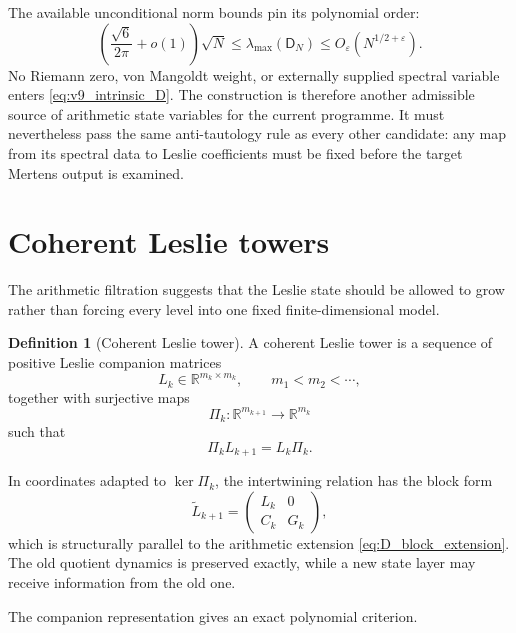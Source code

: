 \documentclass[11pt]{amsart}
\numberwithin{equation}{section}
\theoremstyle{plain}
\theoremstyle{definition}
\newtheorem{definition}[theorem]{Definition}
\theoremstyle{remark}
\begin{document}
The available unconditional norm bounds pin its polynomial order:
\begin{equation}
\left(\frac{\sqrt6}{2\pi}+o(1)\right)\sqrt N
\le
\lambda_{\max}(\mathsf D_N)
\le
O_\varepsilon(N^{1/2+\varepsilon}).
\label{eq:v9_intrinsic_D_bounds}
\end{equation}
No Riemann zero, von Mangoldt weight, or externally supplied spectral variable enters
\eqref{eq:v9_intrinsic_D}.  The construction is therefore another admissible source of
arithmetic state variables for the current programme.  It must nevertheless pass the same
anti-tautology rule as every other candidate: any map from its spectral data to Leslie
coefficients must be fixed before the target Mertens output is examined.


\section{Coherent Leslie towers}
\label{sec:coherent_leslie_towers}

The arithmetic filtration suggests that the Leslie state should be allowed to grow rather than
forcing every level into one fixed finite-dimensional model.

\begin{definition}[Coherent Leslie tower]
\label{def:coherent_leslie_tower}
A coherent Leslie tower is a sequence of positive Leslie companion matrices
\[
L_k\in\mathbb R^{m_k\times m_k},
\qquad
m_1<m_2<\cdots,
\]
together with surjective maps
\[
\Pi_k:\mathbb R^{m_{k+1}}\to\mathbb R^{m_k}
\]
such that
\begin{equation}
\boxed{\Pi_kL_{k+1}=L_k\Pi_k.}
\label{eq:leslie_intertwining}
\end{equation}
\end{definition}

In coordinates adapted to $\ker\Pi_k$, the intertwining relation has the block form
\begin{equation}
\widetilde L_{k+1}
=
\begin{pmatrix}
L_k&0\\
C_k&G_k
\end{pmatrix},
\label{eq:leslie_block_tower}
\end{equation}
which is structurally parallel to the arithmetic extension
\eqref{eq:D_block_extension}.  The old quotient dynamics is preserved exactly, while a new
state layer may receive information from the old one.

The companion representation gives an exact polynomial criterion.
\end{document}
